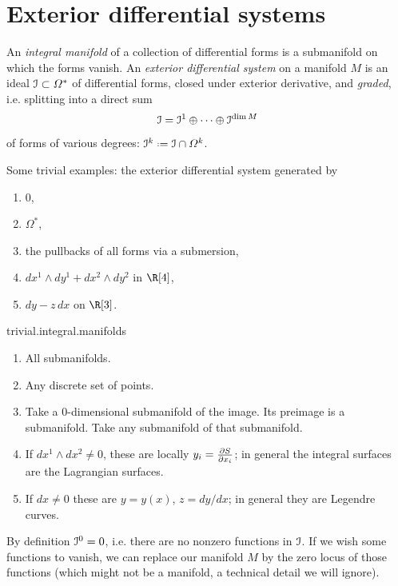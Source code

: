 \section{Exterior differential systems}
An \emph{integral manifold} of a collection of differential forms is a submanifold on which the forms vanish.
An \emph{exterior differential system} on a manifold \(M\) is an ideal \(\mathcal{I} \subset \Omega^*\) of differential forms, closed under exterior derivative, and \emph{graded}, i.e. splitting into a direct sum
\[
\mathcal{I}=\mathcal{I}^1 \oplus \dots \oplus \mathcal{I}^{\dim M}
\]
of forms of various degrees: \(\II^k \defeq \II \cap \Omega^k\).
\begin{example}
Some trivial examples: the exterior differential system generated by
\begin{enumerate}
\item \(0\),
\item \(\Omega^*\), 
\item the pullbacks of all forms via a submersion,
\item \(dx^1 \wedge dy^1 + dx^2 \wedge dy^2\) in \(\R[4]\),
\item \(dy-z \,dx\) on \(\R[3]\).
\end{enumerate}
\end{example}
%
\begin{answer}{trivial.integral.manifolds}%
\begin{enumerate}
\item All submanifolds.
\item Any discrete set of points. 
\item Take a \(0\)-dimensional submanifold of the image.
Its preimage is a submanifold. 
Take any submanifold of that submanifold.
\item If \(dx^1 \wedge dx^2 \ne 0\), these are locally \(y_i=\pderiv{S}{x_i}\); in general the integral surfaces are the Lagrangian surfaces.
\item If \(dx\ne 0\) these are \(y=y(x)\), \(z=dy/dx\); in general they are Legendre curves.
\end{enumerate}
\end{answer}
By definition \(\mathcal{I}^0=0\), i.e. there are no nonzero functions in \(\mathcal{I}\).
If we wish some functions to vanish, we can replace our manifold \(M\) by the zero locus of those functions (which might not be a manifold, a technical detail we will ignore).

